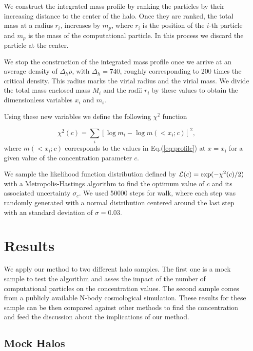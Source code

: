 \documentclass[useAMS,usenatbib]{mn2e}
\begin{document}
We construct the integrated mass profile by ranking the particles by
their increasing distance to the center of the halo. Once they are ranked,
the total mass at a radius $r_i$, increases by $m_p$, where $r_i$ is
the position of the $i$-th particle and $m_p$ is the mass of the
computational particle.  In this process we discard the
particle at the center.

We stop the construction of the integrated mass profile once we arrive
at an average density of $\Delta_h\bar{\rho}$, with $\Delta_h=740$,
roughly corresponding to 200 times the critical density. This radius marks the
virial radius and the virial mass. We divide the total mass enclosed
mass $M_i$ and the radii $r_i$ by these values to obtain the
dimensionless variables $x_i$ and $m_i$.

Using these new variables we define the following $\chi^2$ function

\begin{equation}
\chi^2(c) = \sum_{i}[\log m_i - \log m(< x_i;c)]^2,
\end{equation}
%
where $m(<x_i;c)$ corresponds to the values in Eq.(\ref{eq:profile}) at
$x=x_i$ for a given value of the concentration parameter $c$.

We sample the likelihood function distribution defined by ${\cal
  L}(c)=\exp(-\chi^2(c)/2)$ with a Metropolis-Hastings algorithm to
find the optimum value of $c$ and its  associated uncertainty
$\sigma_c$. We used 50000 steps for walk, where each step was randomly generated
with a normal distribution centered around the last step with an standard
deviation of $\sigma=0.03$.

\section{Results}
\label{sec:results}

We apply our method to two different halo samples. The first one is a
mock sample to test the algorithm and asses the impact of the number
of computational particles on the concentration values. The second
sample comes from a publicly available N-body cosmological
simulation. These results for these sample can be then compared
against other methods to find the concentration and feed the
discussion about the implications of our method.

\subsection{Mock Halos}
\end{document}
